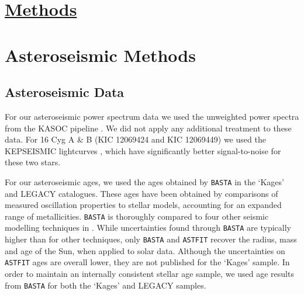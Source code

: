 %
%
%
%
%

\section*{\underline{Methods}}
\section{Asteroseismic Methods}
\subsection{Asteroseismic Data}
For our asteroseismic power spectrum data we used the unweighted power spectra from the KASOC pipeline \cite{handberg+lund2014}. We did not apply any additional treatment to these data. For 16 Cyg A \& B (KIC 12069424 and KIC 12069449) we used the KEPSEISMIC lightcurves \cite{garcia+2011}, which have significantly better signal-to-noise for these two stars.

For our asteroseismic ages, we used the ages obtained by \texttt{BASTA} \cite[BAyesian STellar Algorithm]{m_silvaaguirre+2015} in the `Kages' and LEGACY catalogues. These ages have been obtained by comparisons of measured oscillation properties to stellar models, accounting for an expanded range of metallicities. \texttt{BASTA} is thoroughly compared to four other seismic modelling techniques in \cite{silvaaguirre+2017}. While uncertainties found through \texttt{BASTA} are typically higher than for other techniques, only \texttt{BASTA} and \texttt{ASTFIT} \cite[Aarhus STellar Evolution Code]{m_christensen-dalsgaard2008} recover the radius, mass and age of the Sun, when applied to solar data. Although the uncertainties on \texttt{ASTFIT} ages are overall lower, they are not published for the `Kages' sample. In order to maintain an internally consistent stellar age sample, we used age results from \texttt{BASTA} for both the `Kages' and LEGACY samples.

